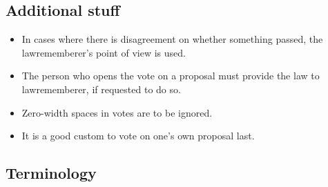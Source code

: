 \documentclass[11pt]{article}
\begin{document}
\subsection{Additional stuff}

\begin{itemize}
\item In cases where there is disagreement on whether something passed, the
lawrememberer's point of view is used.
\item The person who opens the vote on a proposal must provide the law to lawrememberer,
if requested to do so.
\item Zero-width spaces in votes are to be ignored.
\item It is a good custom to vote on one's own proposal last.
\end{itemize}


\subsection{Terminology}
\end{document}
